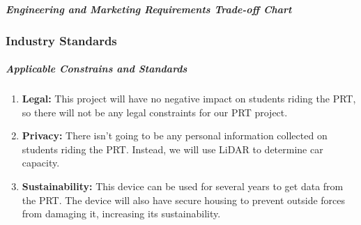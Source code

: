 \subparagraph{Engineering and Marketing Requirements Trade-off Chart}


\subsubsection{Industry Standards}
\subparagraph{Applicable Constrains and Standards}
\begin{enumerate}
    \item \textbf{Legal:} This project will have no negative impact on students riding the PRT, so there will not be any legal constraints for our PRT project.
    \item \textbf{Privacy:} There isn't going to be any personal information collected on students riding the PRT. Instead, we will use LiDAR to determine car capacity.
    \item \textbf{Sustainability:} This device can be used for several years to get data from the PRT. The device will also have secure housing to prevent outside forces from damaging it, increasing its sustainability.
\end{enumerate}